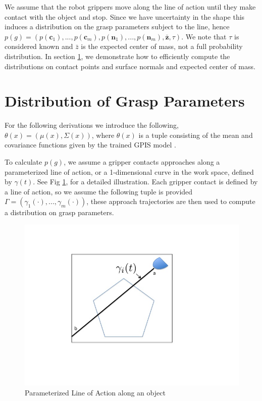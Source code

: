 \documentclass[letterpaper, 10 pt, conference]{ieeeconf}  %
\begin{document}
We assume that the robot grippers move along the line of action until they make contact with the object and stop.
Since we have uncertainty in the shape this induces a distribution on the grasp parameters subject to the line, hence $p(g) = ( p(\textbf{c}_1),...,p(\textbf{c}_m),p(\textbf{n}_1),...,p(\textbf{n}_m),\bar{\textbf{z}},\tau )$.
We note that $\tau$ is considered known and $\bar{z}$ is the expected center of mass, not a full probability distribution. In section \ref{sec:distgrasp}, we demonstrate how to efficiently compute the distributions on contact points and surface normals and expected center of mass. 




\section{Distribution of Grasp Parameters}
\label{sec:distgrasp}

 For the following derivations we introduce the following,
 $\theta(x) = ( \mu(x),\Sigma(x) )$, where $\theta(x)$ is a tuple consisting of the mean and covariance functions given by the trained GPIS model \cite{rasmussen2006} . 
 
 To calculate $p(g)$, we assume a gripper contacts approaches along a parameterized line of action, or a 1-dimensional curve in the work space, defined by $\gamma(t)$. See Fig \ref{fig:line_of_action}, for a detailed illustration. Each gripper contact is defined by a line of action, so we assume the following tuple is provided $\Gamma = ( \gamma_1(\cdot),...,\gamma_m(\cdot) )$, these approach trajectories are then used to compute a distribution on grasp parameters. 
 





\begin{figure}[ht!]
\centering
\includegraphics[scale = 0.3]{figures/Slide01.jpg}
\caption{Parameterized Line of Action along an object}
\vspace*{-10pt}
\label{fig:line_of_action}
\end{figure}
\end{document}
